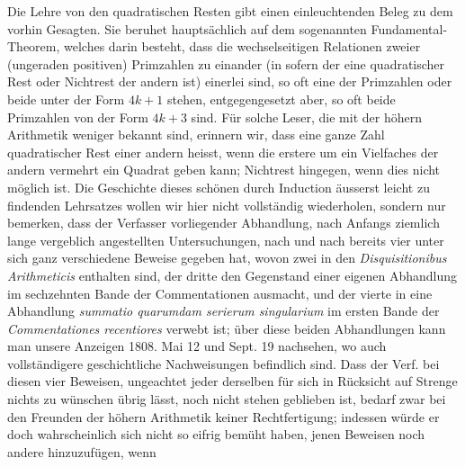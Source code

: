 Die Lehre von den quadratischen Resten gibt einen einleuchtenden Beleg zu dem vorhin Gesagten. Sie beruhet hauptsächlich auf dem sogenannten Fundamental-Theorem, welches darin besteht, dass die wechselseitigen Relationen zweier (ungeraden positiven) Primzahlen zu einander (in sofern der eine quadratischer Rest oder Nichtrest der andern ist) einerlei sind, so oft eine der Primzahlen oder beide unter der Form $4k+1$ stehen, entgegengesetzt aber, so oft beide Primzahlen von der Form $4k+3$ sind. Für solche Leser, die mit der höhern Arithmetik weniger bekannt sind, erinnern wir, dass eine ganze Zahl quadratischer Rest einer andern heisst, wenn die erstere um ein Vielfaches der andern vermehrt ein Quadrat geben kann; Nichtrest hingegen, wenn dies nicht möglich ist. Die Geschichte dieses schönen durch Induction äusserst leicht zu findenden Lehrsatzes wollen wir hier nicht vollständig wiederholen, sondern nur bemerken, dass der Verfasser vorliegender Abhandlung, nach Anfangs ziemlich lange vergeblich angestellten Untersuchungen, nach und nach bereits vier unter sich ganz verschiedene Beweise gegeben hat, wovon zwei in den \emph{Disquisitionibus Arithmeticis} enthalten sind, der dritte den Gegenstand einer eigenen Abhandlung im sechzehnten Bande der Commentationen ausmacht, und der vierte in eine Abhandlung \emph{summatio quarumdam serierum singularium} im ersten Bande der \emph{Commentationes recentiores} verwebt ist; über diese beiden Abhandlungen kann man unsere Anzeigen 1808. Mai 12 und Sept. 19 nachsehen, wo auch vollständigere geschichtliche Nachweisungen befindlich sind. Dass der Verf. bei diesen vier Beweisen, ungeachtet jeder derselben für sich in Rücksicht auf Strenge nichts zu wünschen übrig lässt, noch nicht stehen geblieben ist, bedarf zwar bei den Freunden der höhern Arithmetik keiner Rechtfertigung; indessen würde er doch wahrscheinlich sich nicht so eifrig bemüht haben, jenen Beweisen noch andere hinzuzufügen, wenn
